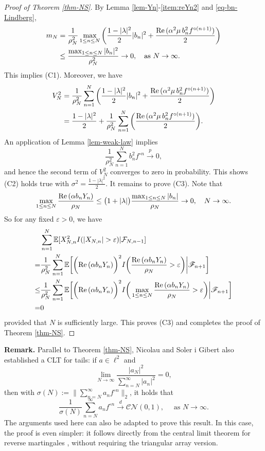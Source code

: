 \documentclass[11pt, reqno]{amsart}
\theoremstyle{definition}
\newtheorem*{Brown-Eagleson Theorem}{The Brown-Eagleson Theorem}
\newcommand{\F}{\mathscr F}
\newcommand{\E}{\mathbb E}
\newcommand{\cal}{\mathcal}
\begin{document}
\begin{proof}[Proof of Theorem \ref{thm-NS}]
		By Lemma \ref{lem-Yn}-\ref{item:reYn2} and \eqref{eq-bn-Lindberg},
		\begin{align*}
			m_N&=\frac{1}{\rho^2_N} \max_{1\leq n \leq N} \bigg(\frac{1-|\lambda|^2}{2} |b_n|^2+ \frac{{\rm Re}\,(\alpha^2 \mu \,b_n^2f^{\circ (n+1)})}{2}\bigg)\\
			&\leq \frac{\max_{1\leq n\leq N} |b_n|^2}{\rho^2_N}\to 0, \quad \text{as $N\to \infty$}.
		\end{align*}
		This implies (C1). Moreover, we have 
		\begin{align} 
			V_N^2&= \frac{1}{\rho^2_N}\sum_{n=1}^N \bigg(\frac{1-|\lambda|^2}{2} |b_n|^2+ \frac{{\rm Re}\,(\alpha^2 \mu \,b_n^2f^{\circ (n+1)})}{2}\bigg) \nonumber \\
			&=\frac{1-|\lambda|^2}{2}+ \frac{1}{\rho^2_N}\sum_{n=1}^N \bigg(\frac{{\rm Re}\,(\alpha^2 \mu \,b_n^2f^{\circ (n+1)})}{2}\bigg). \label{eq-VN-value}
		\end{align}
		An application of Lemma \ref{lem-weak-law} implies $$\frac{1}{\rho^2_N} \sum_{n=1}^N b_n^2 f^{\circ n} \stackrel{p}{\longrightarrow} 0,$$ and hence the second term of $V_N^2$ converges to zero in probability. This shows (C2) holds true with $\sigma^2 = \frac{1-|\lambda|^2}{2}$. It remains to prove (C3). Note that $$\max_{1\leq n\leq N} \frac{{\rm Re}\, (\alpha b_n Y_n)}{\rho_N} \leq  \big(1+|\lambda|\big)\frac{\max_{1\leq n\leq N}|b_n|}{\rho_N}\to 0, \quad N\to \infty.$$ So for any fixed $\varepsilon>0$, we have
		\begin{align*}
			&\sum_{n=1}^N \E[X_{N,n}^2 I(|X_{N,n}|>\varepsilon)| \cal F_{N,n-1}]\\
			=&\frac{1}{\rho^2_N} \sum_{n=1}^N \E\bigg[\bigg({\rm Re}\, (\alpha b_n Y_n)\bigg)^2 I\bigg(\frac{{\rm Re}\, (\alpha b_n Y_n)}{\rho_N}> \varepsilon \bigg) \bigg| \F_{n+1}\bigg]\\
			\leq& \frac{1}{\rho^2_N} \sum_{n=1}^N \E\bigg[\bigg({\rm Re}\, (\alpha b_n Y_n)\bigg)^2 I\bigg(\max_{1\leq n\leq N}\frac{{\rm Re}\, (\alpha b_n Y_n)}{\rho_N}> \varepsilon\bigg) \bigg| \F_{n+1}\bigg]\\
			=&0
		\end{align*}
		provided that $N$ is sufficiently large. This proves (C3) and completes the proof of Theorem \ref{thm-NS}.
\end{proof}

	\noindent \textbf{Remark.} Parallel to Theorem \ref{thm-NS}, Nicolau and Soler i Gibert also established a CLT for tails: if $a\in \ell^2$ and $$\lim_{N\to \infty} \frac{|a_N|^2}{\sum_{n=N}^\infty |a_n|^2}=0,$$ then with $\sigma(N):= \big\|\sum_{n=N}^\infty a_n f^{\circ n}\big\|_2$, it holds that $$\frac{1}{\sigma(N)}\sum_{n=N}^\infty a_n f^{\circ n}\stackrel{d}{\longrightarrow} \mathcal{CN}(0,1),\quad \text{ as $N\to \infty$}.$$ The arguments used here can also be adapted to prove this result. In this case, the proof is even simpler: it follows directly from the central limit theorem for reverse martingales \cite{Loy69}, without requiring the triangular array version. 
\end{document}
